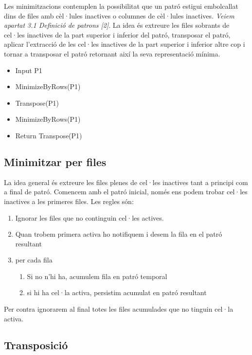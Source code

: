\documentclass[12pt,a4paper]{report}
\begin{document}
Les minimitzacions contemplen la possibilitat que un patró estigui embolcallat dins de files amb cèl·lules inactives o columnes de cèl·lules inactives. \textit{Veiem apartat 3.1 Definició de patrons [2]}. La idea és extreure les files sobrants de cel·les inactives de la part superior i inferior del patró, transposar el patró, aplicar l'extracció de les cel·les inactives de la part superior i inferior altre cop i tornar a transposar el patró retornant així la seva representació mínima.

\begin{itemize}
\item Input P1
\item MinimizeByRows(P1)
\item Transpose(P1)
\item MinimizeByRows(P1)
\item Return Transpose(P1)

\end{itemize}

\subsection{Minimitzar per files}

La idea general és extreure les files plenes de cel·les inactives tant a principi com a final de patró. Comencem amb el patró inicial, només ens podem trobar cel·les inactives a les primeres files. Les regles són:

\begin{enumerate}
\item Ignorar les files que no continguin cel·les actives.
\item Quan trobem primera activa ho notifiquem i desem la fila en el patró resultant
\item per cada fila
	\begin{enumerate}
		\item Si no n’hi ha, acumulem fila en patró temporal
		\item si hi ha cel·la activa, persistim acumulat en patró resultant
	\end{enumerate}
\end{enumerate}

Per contra ignorarem al final totes les files acumulades que no tinguin cel·la activa.

\subsection{Transposició}
\end{document}
